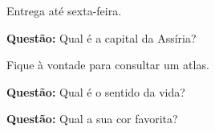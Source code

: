 \documentclass[12pt]{memoir}
\newenvironment{questao}{\par\textbf{Questão:}}{\par}
\begin{document}
Entrega até sexta-feira.
\begin{questao}
Qual é a capital da Assíria?
\end{questao}

Fique à vontade para consultar um atlas.

\begin{questao}
Qual é o sentido da vida?
\end{questao}

\begin{questao}
Qual a sua cor favorita?
\end{questao}
\end{document}
